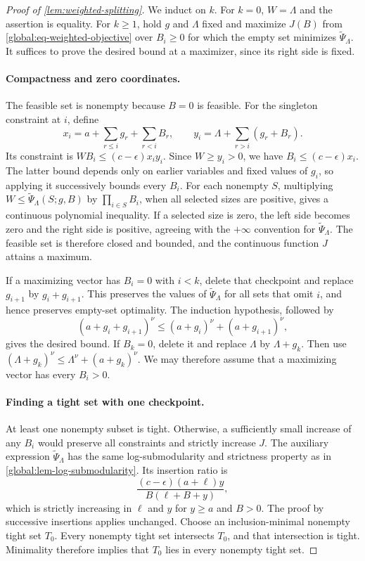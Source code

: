 \documentclass[11pt,letterpaper]{article}
\theoremstyle{definition}
\begin{document}
\begin{proof}[Proof of \cref{lem:weighted-splitting}]
We induct on $k$.
For $k=0$, $W=\Lambda$ and the assertion is equality.
For $k\ge1$, hold $g$ and $\Lambda$ fixed and maximize $J(B)$ from \eqref{global:eq-weighted-objective} over $B_i\ge0$ for which the empty set minimizes $\widetilde\Psi_\Lambda$.
It suffices to prove the desired bound at a maximizer, since its right side is fixed.

\paragraph{Compactness and zero coordinates.}
The feasible set is nonempty because $B=0$ is feasible.
For the singleton constraint at $i$, define
\[
  x_i=a+\sum_{r\le i}g_r+\sum_{r<i}B_r,
  \qquad y_i=\Lambda+\sum_{r>i}(g_r+B_r).
\]
Its constraint is $WB_i\le(c-\epsilon) x_i y_i$.
Since $W\ge y_i>0$, we have $B_i\le(c-\epsilon) x_i$.
The latter bound depends only on earlier variables and fixed values of $g_i$, so applying it successively bounds every $B_i$.
For each nonempty $S$, multiplying $W\le\widetilde\Psi_\Lambda(S;g,B)$ by $\prod_{i\in S}B_i$, when all selected sizes are positive, gives a continuous polynomial inequality.
If a selected size is zero, the left side becomes zero and the right side is positive, agreeing with the $+\infty$ convention for $\widetilde\Psi_\Lambda$.
The feasible set is therefore closed and bounded, and the continuous function $J$ attains a maximum.

If a maximizing vector has $B_i=0$ with $i<k$, delete that checkpoint and replace $g_{i+1}$ by $g_i+g_{i+1}$.
This preserves the values of $\widetilde\Psi_\Lambda$ for all sets that omit $i$, and hence preserves empty-set optimality.
The induction hypothesis, followed by
\[
  (a+g_i+g_{i+1})^\nu
  \le(a+g_i)^\nu+(a+g_{i+1})^\nu,
\]
gives the desired bound.
If $B_k=0$, delete it and replace $\Lambda$ by $\Lambda+g_k$. Then use $(\Lambda+g_k)^\nu\le\Lambda^\nu+(a+g_k)^\nu$.
We may therefore assume that a maximizing vector has every $B_i>0$.

\paragraph{Finding a tight set with one checkpoint.}
At least one nonempty subset is tight.
Otherwise, a sufficiently small increase of any $B_i$ would preserve all constraints and strictly increase $J$.
The auxiliary expression $\widetilde\Psi_\Lambda$ has the same log-submodularity and strictness property as in \cref{global:lem-log-submodularity}. Its insertion ratio is
\[
  \frac{(c-\epsilon)(a+\ell)y}{B(\ell+B+y)},
\]
which is strictly increasing in $\ell$ and $y$ for $y\ge a$ and $B>0$.
The proof by successive insertions applies unchanged.
Choose an inclusion-minimal nonempty tight set $T_0$.
Every nonempty tight set intersects $T_0$, and that intersection is tight.
Minimality therefore implies that $T_0$ lies in every nonempty tight set.


\end{proof}
\end{document}
